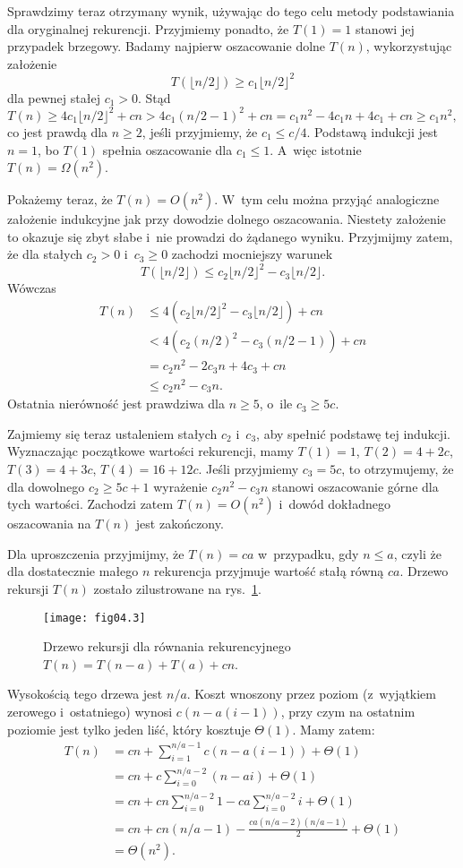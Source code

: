 Sprawdzimy teraz otrzymany wynik, używając do tego celu metody podstawiania dla oryginalnej rekurencji. Przyjmiemy ponadto, że $T(1)=1$ stanowi jej przypadek brzegowy. Badamy najpierw oszacowanie dolne $T(n)$, wykorzystując założenie
\[
	T(\lfloor n/2\rfloor) \ge c_1\lfloor n/2\rfloor^2
\]
dla pewnej stałej $c_1>0$. Stąd
\[
	T(n) \ge 4c_1\lfloor n/2\rfloor^2+cn > 4c_1(n/2-1)^2+cn = c_1n^2-4c_1n+4c_1+cn \ge c_1n^2,
\]
co jest prawdą dla $n\ge2$, jeśli przyjmiemy, że $c_1\le c/4$. Podstawą indukcji jest $n=1$, bo $T(1)$ spełnia oszacowanie dla $c_1\le1$. A~więc istotnie $T(n)=\Omega(n^2)$.

Pokażemy teraz, że $T(n)=O(n^2)$. W~tym celu można przyjąć analogiczne założenie indukcyjne jak przy dowodzie dolnego oszacowania. Niestety założenie to okazuje się zbyt słabe i~nie prowadzi do żądanego wyniku. Przyjmijmy zatem, że dla stałych $c_2>0$ i~$c_3\ge0$ zachodzi mocniejszy warunek
\[
	T(\lfloor n/2\rfloor) \le c_2\lfloor n/2\rfloor^2-c_3\lfloor n/2\rfloor.
\]
Wówczas
\begin{align*}
	T(n) &\le 4(c_2\lfloor n/2\rfloor^2-c_3\lfloor n/2\rfloor)+cn \\
	&< 4(c_2(n/2)^2-c_3(n/2-1))+cn \\
	&= c_2n^2-2c_3n+4c_3+cn \\
	&\le c_2n^2-c_3n.
\end{align*}
Ostatnia nierówność jest prawdziwa dla $n\ge5$, o~ile $c_3\ge5c$.

Zajmiemy się teraz ustaleniem stałych $c_2$ i~$c_3$, aby spełnić podstawę tej indukcji. Wyznaczając początkowe wartości rekurencji, mamy $T(1)=1$, $T(2)=4+2c$, $T(3)=4+3c$, $T(4)=16+12c$. Jeśli przyjmiemy $c_3=5c$, to otrzymujemy, że dla dowolnego $c_2\ge5c+1$ wyrażenie $c_2n^2-c_3n$ stanowi oszacowanie górne dla tych wartości. Zachodzi zatem $T(n)=O(n^2)$ i~dowód dokładnego oszacowania na $T(n)$ jest zakończony.

\exercise %
Dla uproszczenia przyjmijmy, że $T(n)=ca$ w~przypadku, gdy $n\le a$, czyli że dla dostatecznie małego $n$ rekurencja przyjmuje wartość stałą równą $ca$. Drzewo rekursji $T(n)$ zostało zilustrowane na rys.~\ref{fig:4.2-4}.
\begin{figure}[ht]
	\begin{center}
		\texttt{[image: fig04.3]}
	\end{center}
	\caption{Drzewo rekursji dla równania rekurencyjnego $T(n)=T(n-a)+T(a)+cn$.} \label{fig:4.2-4}
\end{figure}
Wysokością tego drzewa jest $n/a$. Koszt wnoszony przez  poziom (z~wyjątkiem zerowego i~ostatniego) wynosi $c(n-a(i-1))$, przy czym na ostatnim poziomie jest tylko jeden liść, który kosztuje $\Theta(1)$. Mamy zatem:
\begin{align*}
	T(n) &= cn+\sum_{i=1}^{n/a-1}c(n-a(i-1))+\Theta(1) \\
	&= cn+c\sum_{i=0}^{n/a-2}(n-ai)+\Theta(1) \\
	&= cn+cn\sum_{i=0}^{n/a-2}1-ca\sum_{i=0}^{n/a-2}i+\Theta(1) \\
	&= cn+cn(n/a-1)-\frac{ca(n/a-2)(n/a-1)}{2}+\Theta(1) \\
	&= \Theta(n^2).
\end{align*}

